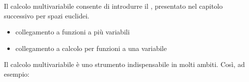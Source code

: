 \documentclass[letterpaper,10pt,italian]{jupyterBook}
\begin{document}
\sphinxAtStartPar
Il calcolo multi\sphinxhyphen{}variabile consente di introdurre il {\hyperref[\detokenize{ch/vector-calculus:vector-calculus}]{}}, presentato nel capitolo successivo per spazi euclidei.

\sphinxAtStartPar
{}
\begin{itemize}
\item {} 
\sphinxAtStartPar
collegamento a funzioni a più variabili

\item {} 
\sphinxAtStartPar
collegamento a calcolo per funzioni a una variabile

\end{itemize}

\sphinxAtStartPar
{} Il calcolo multivariabile è uno strumento indispensabile in molti ambiti. Così, ad esempio:
\end{document}
